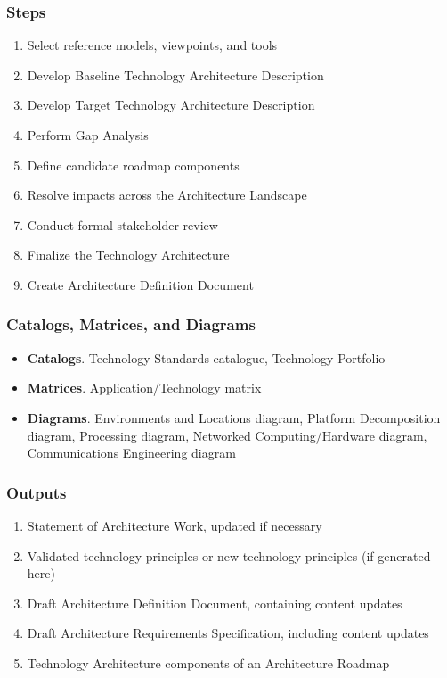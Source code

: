 \documentclass[aspectratio=169, table]{beamer}
\begin{document}
	\begin{frame}
		\frametitle{Steps}
		\vspace{20pt}
		\begin{enumerate}
			\item Select reference models, viewpoints, and tools
			\item Develop Baseline Technology Architecture Description
			\item Develop Target Technology Architecture Description
			\item Perform Gap Analysis
			\item Define candidate roadmap components
			\item Resolve impacts across the Architecture Landscape
			\item Conduct formal stakeholder review
			\item Finalize the Technology Architecture
			\item Create Architecture Definition Document
		\end{enumerate}
	\end{frame}

	\begin{frame}
		\frametitle{Catalogs, Matrices, and Diagrams}
		\begin{itemize}
			\item \textbf{Catalogs}. Technology Standards catalogue, Technology Portfolio
			\item \textbf{Matrices}. Application/Technology matrix
			\item \textbf{Diagrams}. Environments and Locations diagram, Platform Decomposition diagram, Processing diagram, Networked Computing/Hardware diagram, Communications Engineering diagram
		\end{itemize}
	\end{frame}

	\begin{frame}
		\frametitle{Outputs}
		\begin{enumerate}
			\item Statement of Architecture Work, updated if necessary
			\item Validated technology principles or new technology principles (if generated here)
			\item Draft Architecture Definition Document, containing content updates
			\item Draft Architecture Requirements Specification, including content updates
			\item Technology Architecture components of an Architecture Roadmap
		\end{enumerate}
	\end{frame}
\end{document}
